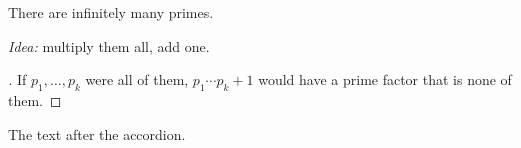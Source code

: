 \begin{theorem}
There are infinitely many primes.
\end{theorem}
\begin{webaccordion}
\begin{webpane}[collapsed]
\noindent\textit{Idea:} multiply them all, add one. \webnextpane[Proof]
\end{webpane}
\begin{webpane}[expanded]
\begin{proof}[\proofname{}]
If $p_1, \dots, p_k$ were all of them, $p_1 \cdots p_k + 1$ would have a
prime factor that is none of them.
\end{proof}
\end{webpane}
\end{webaccordion}
The text after the accordion.
